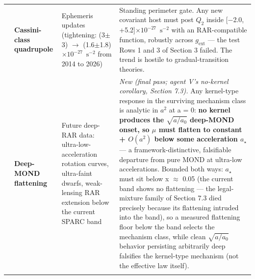 \documentclass[11pt,a4paper]{article}
\begin{document}
\begin{longtable}{@{}c >{\raggedright\arraybackslash}p{2.1cm} >{\raggedright\arraybackslash}p{2.9cm} p{9.0cm}@{}}
\addlinespace
8 & \textbf{Cassini-class quadrupole} & Ephemeris updates (tightening: (3$\pm$3) $\to$ (1.6$\pm$1.8)$\times10^{-27}$\ $\mathrm{s^{-2}}$ from 2014 to 2026) & Standing perimeter gate. Any new covariant host must post $Q_2$ inside [$-$2.0, +5.2]$\times10^{-27}$\ $\mathrm{s^{-2}}$ with an RAR-compatible function, robustly across $g_{\mathrm{ext}}$ --- the test Rows 1 and 3 of Section 3 failed. The trend is hostile to gradual-transition theories. \\
\addlinespace
9 & \textbf{Deep-MOND flattening} & Future deep-RAR data: ultra-low-acceleration rotation curves, ultra-faint dwarfs, weak-lensing RAR extension below the current SPARC band & \emph{New (final pass; agent V's no-kernel corollary, Section 7.3).} Any kernel-type response in the surviving mechanism class is analytic in $a^{2}$ at a = 0: \textbf{no kernel produces the $\sqrt{a/a_0}$ deep-MOND onset, so $\mu$ must flatten to constant + $O(a^2)$ below some acceleration $a_\star$} --- a framework-distinctive, falsifiable departure from pure MOND at ultra-low accelerations. Bounded both ways: $a_\star$ must sit below x $\approx$ 0.05 (the current band shows no flattening --- the legal-mixture family of Section 7.3 died precisely because its flattening intruded into the band), so a measured flattening floor below the band selects the mechanism class, while clean $\sqrt{a/a_0}$ behavior persisting arbitrarily deep falsifies the kernel-type mechanism (not the effective law itself). \\
\addlinespace
\end{longtable}
\end{document}
